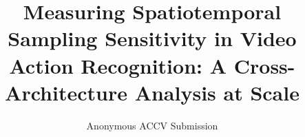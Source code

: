 \documentclass[runningheads]{llncs}
\newcommand{\rev}[1]{\textcolor{revblue}{#1}}
\begin{document}
\raggedbottom

\title{\rev{Measuring Spatiotemporal Sampling Sensitivity in Video Action
Recognition: A Cross-Architecture Analysis at Scale}}

\titlerunning{\rev{Spatiotemporal Sampling Sensitivity in Video Action Recognition}}

\author{Anonymous ACCV Submission}
\institute{}
\maketitle
\end{document}

